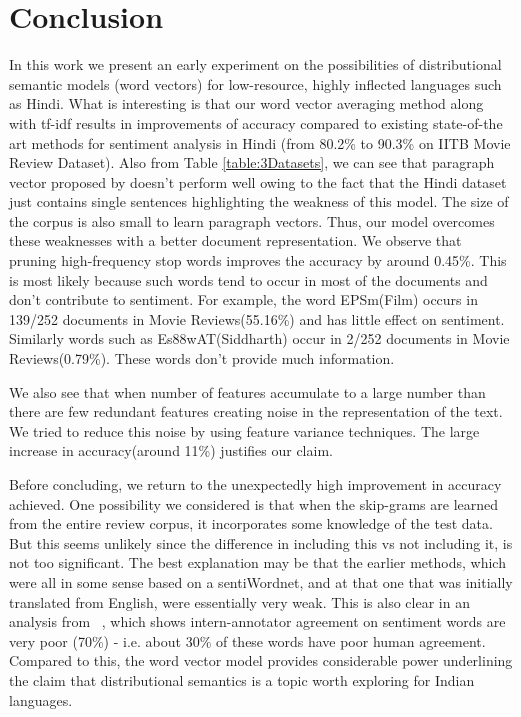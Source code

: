 \documentclass[11pt,a4paper]{article}
\begin{document}
\section{Conclusion}
\label{sec:conclusion}
In this work we present an early experiment on the possibilities of distributional semantic models (word vectors) for low-resource, highly inflected languages such as Hindi.  What is interesting is that our word vector averaging method along with tf-idf results in improvements of accuracy compared to existing state-of-the art methods for sentiment analysis in Hindi (from 80.2\% to 90.3\% on IITB Movie Review Dataset). Also from Table \ref{table:3Datasets}, we can see that paragraph vector proposed by \cite{Le:14} doesn't perform well owing to the fact that the Hindi dataset just contains single sentences highlighting the weakness of this model. The size of the corpus is also small to learn paragraph vectors. Thus, our model overcomes these weaknesses with a better document representation.
We observe that pruning high-frequency stop words improves the accuracy by around 0.45\%. This is most likely  because such words tend to occur in most of the documents and don't contribute to sentiment. For example, the word {\dn EPSm}(Film) occurs in 139/252 documents in Movie Reviews(55.16\%) and has little effect on sentiment. Similarly words such as {\dn Es\388wAT\0}(Siddharth) occur in 2/252 documents in Movie Reviews(0.79\%). These words don't provide much information.

We also see that when number of features accumulate to a large number than there are few redundant features creating noise in the representation of the text. We tried to reduce this noise by using feature variance techniques. The large increase in accuracy(around 11\%) justifies our claim.

Before concluding, we return to the unexpectedly high improvement in accuracy achieved. One possibility we considered is that when the skip-grams are learned from the entire review corpus, it incorporates some knowledge of the test data.  But this seems unlikely since the difference in including this vs not including it, is not too significant.  The best explanation may be that the earlier methods, which were all in some sense based on a sentiWordnet, and at that one that was initially translated from English, were essentially very weak.  This is also clear in an analysis from
~\cite{Bakliwal:12}, which shows intern-annotator agreement on sentiment words are very poor (70\%) - i.e. about 30\% of these words have poor human agreement. Compared to this, the word vector model  
provides considerable power underlining the claim that distributional semantics is a topic worth exploring for Indian languages.
\end{document}
